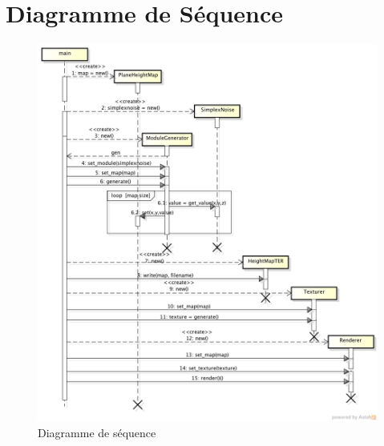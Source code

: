 \chapter{Diagramme de Séquence}
\begin{figure}[h!]

        \includegraphics[width=15cm]{resources/sequence-diagram.png}
        \caption{Diagramme de séquence}

\end{figure}

